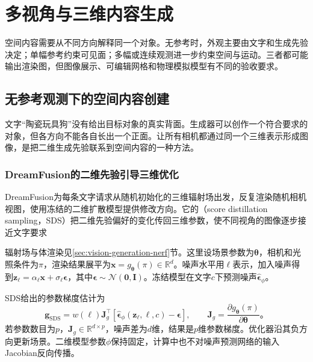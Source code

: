 \section{多视角与三维内容生成}
\label{sec:vision-multigen-3d}

空间内容需要从不同方向解释同一个对象。无参考时，外观主要由文字和生成先验决定；单幅参考约束可见面；多幅或连续观测进一步约束空间与运动。三者都可能输出渲染图，但图像展示、可编辑网格和物理模拟模型有不同的验收要求。

\subsection{无参考观测下的空间内容创建}
\label{sec:vision-multigen-no-reference}

文字“陶瓷玩具狗”没有给出目标对象的真实背面。生成器可以创作一个符合要求的对象，但各方向不能各自长出一个正面。让所有相机都通过同一个三维表示形成图像，是把二维生成先验联系到空间内容的一种方法。

\Needspace{50mm}
\subsubsection{DreamFusion的二维先验引导三维优化}
\label{sec:vision-multigen-dreamfusion}

DreamFusion为每条文字请求从随机初始化的三维辐射场出发，反复渲染随机相机视图，使用冻结的二维扩散模型提供修改方向。它的（score distillation sampling，SDS）把二维先验偏好的变化传回三维参数，使不同视角的图像逐步接近文字要求

辐射场与体渲染见\ref{sec:vision-generation-nerf}节。这里设场景参数为$\bm\theta$，相机和光照条件为$\pi$，渲染结果展平为$\bm x=g_{\bm\theta}(\pi)\in\mathbb R^d$。噪声水平用$\ell$表示，加入噪声得到$\bm z_\ell=\alpha_\ell\bm x+\sigma_\ell\bm\epsilon$，其中$\bm\epsilon\sim\mathcal N(\bm0,\bm I)$。冻结模型在文字$c$下预测噪声$\widehat{\bm\epsilon}_\phi$。

SDS给出的参数梯度估计为
\begin{equation}
 \bm g_{\mathrm{SDS}}
 =w(\ell)\bm J_g^\top
     [\widehat{\bm\epsilon}_\phi(\bm z_\ell,\ell,c)
       -\bm\epsilon],
 \qquad
 \bm J_g=\frac{\partial g_{\bm\theta}(\pi)}
                 {\partial\bm\theta}\text{。}
 \label{eq:vision-sds-gradient}
\end{equation}
若参数数目为$p$，$\bm J_g\in\mathbb R^{d\times p}$，噪声差为$d$维，结果是$p$维参数梯度。优化器沿其负方向更新场景。二维模型参数$\phi$保持固定，计算中也不对噪声预测网络的输入Jacobian反向传播。

